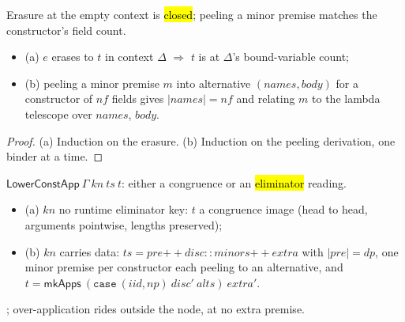 \begin{lemma}
\label{lem:Erases-lbClosed}
\leanok
{}
 Erasure at the empty context is \hl{closed}; peeling a minor premise matches the
constructor's field count.
\begin{itemize}
\item (a) $e$ erases to $t$ in context $\Delta$ $\Rightarrow$ $t$ is  at $\Delta$'s
bound-variable count;
\item (b) peeling a minor premise $m$ into alternative $(\mathit{names}, \mathit{body})$ for a
constructor of $nf$ fields gives $|\mathit{names}| = nf$ and \Lower{} relating $m$ to the lambda
telescope over $\mathit{names}$, $\mathit{body}$.
\end{itemize}
\end{lemma}
\begin{proof}
\leanok
{}
 (a) Induction on the erasure. (b) Induction on the peeling derivation, one binder at a time.
\end{proof}

\begin{definition}
\label{def:LowerConstApp}
\leanok
{}
 $\mathsf{LowerConstApp}\ \Gamma\ kn\ ts\ t$: either a congruence or an
\hl{eliminator} reading.
\begin{itemize}
\item (a) $kn$ no runtime eliminator key: $t$ a congruence image (head to head, arguments pointwise,
lengths preserved);
\item (b) $kn$ carries  data: $ts = pre \mathbin{+\!\!+} disc :: minors \mathbin{+\!\!+}
extra$ with $|pre| = dp$, one minor premise per constructor each peeling to an alternative, and
$t = \mathsf{mkApps}\ (\mathtt{case}\ (iid, np)\ disc'\ alts)\ extra'$.
\end{itemize}
 ; over-application rides outside the node, at no extra premise.
\end{definition}

